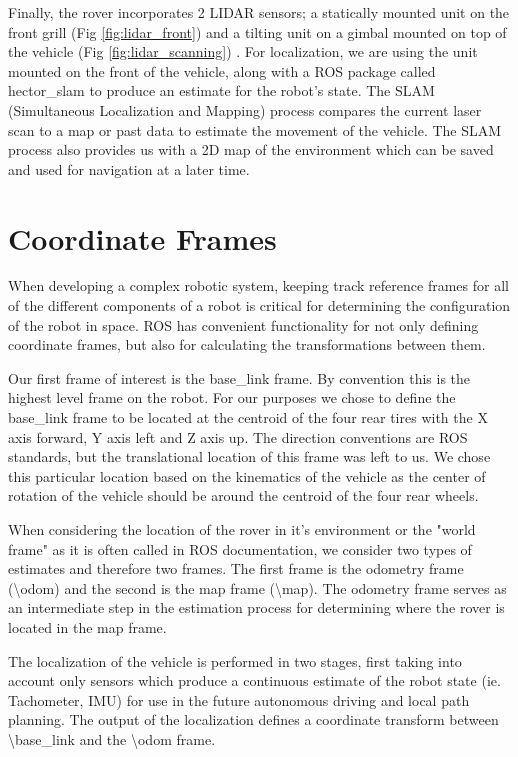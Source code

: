 Finally, the rover incorporates 2 LIDAR sensors; a statically mounted unit on the front grill (Fig \ref{fig:lidar_front}) and a tilting unit on a gimbal mounted on top of the vehicle (Fig \ref{fig:lidar_scanning}) . For localization, we are using the unit mounted on the front of the vehicle, along with a ROS package called hector\_slam to produce an estimate for the robot's state. The SLAM (Simultaneous Localization and Mapping) process compares the current laser scan to a map or past data to estimate the movement of the vehicle. The SLAM process also provides us with a 2D map of the environment which can be saved and used for navigation at a later time.

\section{Coordinate Frames}

When developing a complex robotic system, keeping track reference frames for all of the different components of a robot is critical for determining the configuration of the robot in space. ROS has convenient functionality for not only defining coordinate frames, but also for calculating the transformations between them. 

Our first frame of interest is the base\_link frame. By convention this is the highest level frame on the robot. For our purposes we chose to define the base\_link frame to be located at the centroid of the four rear tires with the X axis forward, Y axis left and Z axis up. The direction conventions are ROS standards, but the translational location of this frame was left to us. We chose this particular location based on the kinematics of the vehicle as the center of rotation of the vehicle should be around the centroid of the four rear wheels. 

When considering the location of the rover in it's environment or the "world frame" as it is often called in ROS documentation, we consider two types of estimates and therefore two frames. The first frame is the odometry frame (\textbackslash odom) and the second is the map frame (\textbackslash map). The odometry frame serves as an intermediate step in the estimation process for determining where the rover is located in the map frame.

The localization of the vehicle is performed in two stages, first taking into account only sensors which produce a continuous estimate of the robot state (ie. Tachometer, IMU) for use in the future autonomous driving and local path planning. The output of the localization defines a coordinate transform between \textbackslash base\_link and the \textbackslash odom frame.

